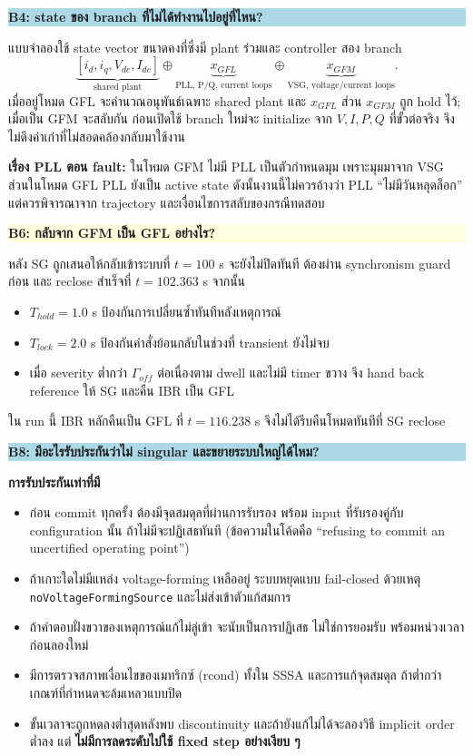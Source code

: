 \documentclass[12pt,a4paper]{article}
\begin{document}
\begin{minipage}[t]{0.475\textwidth}
\noindent\colorbox{lightblue}{\parbox{\dimexpr\linewidth-2\fboxsep\relax}{\textbf{B4: state ของ branch ที่ไม่ได้ทำงานไปอยู่ที่ไหน?}}}

แบบจำลองใช้ state vector ขนาดคงที่ซึ่งมี plant ร่วมและ controller สอง branch
\[
\underbrace{[i_d,i_q,V_{dc},I_{dc}]}_{\text{shared plant}}
\oplus\underbrace{x_{GFL}}_{\text{PLL, P/Q, current loops}}
\oplus\underbrace{x_{GFM}}_{\text{VSG, voltage/current loops}}.
\]
เมื่ออยู่โหมด GFL จะคำนวณอนุพันธ์เฉพาะ shared plant และ $x_{GFL}$ ส่วน $x_{GFM}$ ถูก hold ไว้; เมื่อเป็น GFM จะสลับกัน ก่อนเปิดใช้ branch ใหม่จะ initialize จาก $V,I,P,Q$ ที่ขั้วต่อจริง จึงไม่ดึงค่าเก่าที่ไม่สอดคล้องกลับมาใช้งาน

\smallskip
\textbf{เรื่อง PLL ตอน fault:} ในโหมด GFM ไม่มี PLL เป็นตัวกำหนดมุม เพราะมุมมาจาก VSG ส่วนในโหมด GFL PLL ยังเป็น active state ดังนั้นงานนี้ไม่ควรอ้างว่า PLL ``ไม่มีวันหลุดล็อก'' แต่ควรพิจารณาจาก trajectory และเงื่อนไขการสลับของกรณีทดสอบ

\medskip
\noindent\colorbox{lightyellow}{\parbox{\dimexpr\linewidth-2\fboxsep\relax}{\textbf{B6: กลับจาก GFM เป็น GFL อย่างไร?}}}

หลัง SG ถูกเสนอให้กลับเข้าระบบที่ $t=100$ s จะยังไม่ปิดทันที ต้องผ่าน synchronism guard ก่อน และ reclose สำเร็จที่ $t=102.363$ s จากนั้น
\begin{itemize}
  \item $T_{hold}=1.0$ s ป้องกันการเปลี่ยนซ้ำทันทีหลังเหตุการณ์
  \item $T_{lock}=2.0$ s ป้องกันคำสั่งย้อนกลับในช่วงที่ transient ยังไม่จบ
  \item เมื่อ severity ต่ำกว่า $\Gamma_{off}$ ต่อเนื่องตาม dwell และไม่มี timer ขวาง จึง hand back reference ให้ SG และคืน IBR เป็น GFL
\end{itemize}
ใน run นี้ IBR หลักคืนเป็น GFL ที่ $t=116.238$ s จึงไม่ได้รีบคืนโหมดทันทีที่ SG reclose

\medskip
\noindent\colorbox{lightblue}{\parbox{\dimexpr\linewidth-2\fboxsep\relax}{\textbf{B8: มีอะไรรับประกันว่าไม่ singular และขยายระบบใหญ่ได้ไหม?}}}

\textbf{การรับประกันเท่าที่มี}
\begin{itemize}
  \item ก่อน commit ทุกครั้ง ต้องมีจุดสมดุลที่ผ่านการรับรอง พร้อม input ที่รับรองคู่กับ configuration นั้น ถ้าไม่มีจะปฏิเสธทันที (ข้อความในโค้ดคือ ``refusing to commit an uncertified operating point'')
  \item ถ้าเกาะใดไม่มีแหล่ง voltage-forming เหลืออยู่ ระบบหยุดแบบ fail-closed ด้วยเหตุ \texttt{noVoltageFormingSource} และไม่ส่งเข้าตัวแก้สมการ
  \item ถ้าคำตอบฝั่งขวาของเหตุการณ์แก้ไม่ลู่เข้า จะนับเป็นการปฏิเสธ ไม่ใช่การยอมรับ พร้อมหน่วงเวลาก่อนลองใหม่
  \item มีการตรวจสภาพเงื่อนไขของเมทริกซ์ (rcond) ทั้งใน SSSA และการแก้จุดสมดุล ถ้าต่ำกว่าเกณฑ์ที่กำหนดจะล้มเหลวแบบปิด
  \item ขั้นเวลาจะถูกหดลงต่ำสุดหลังพบ discontinuity และถ้ายังแก้ไม่ได้จะลองวิธี implicit order ต่ำลง แต่ \textbf{ไม่มีการลดระดับไปใช้ fixed step อย่างเงียบ ๆ}
\end{itemize}


\end{minipage}
\end{document}
